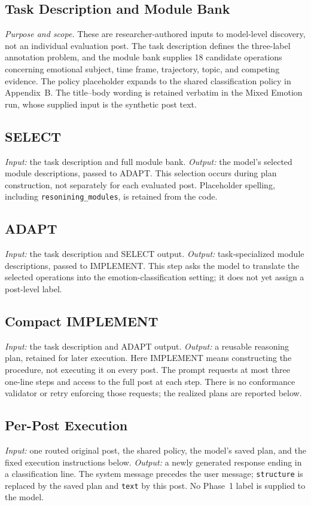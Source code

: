 \documentclass{ieeeaccess}
\begin{document}
\subsection{Task Description and Module Bank}
\textit{Purpose and scope.} These are researcher-authored inputs to model-level discovery, not an individual evaluation post. The task description defines the three-label annotation problem, and the module bank supplies 18 candidate operations concerning emotional subject, time frame, trajectory, topic, and competing evidence. The policy placeholder expands to the shared classification policy in Appendix~B. The title--body wording is retained verbatim in the Mixed Emotion run, whose supplied input is the synthetic post text.


\subsection{SELECT}
\textit{Input:} the task description and full module bank. \textit{Output:} the model's selected module descriptions, passed to ADAPT. This selection occurs during plan construction, not separately for each evaluated post. Placeholder spelling, including \texttt{resonining\_modules}, is retained from the code.

\subsection{ADAPT}
\textit{Input:} the task description and SELECT output. \textit{Output:} task-specialized module descriptions, passed to IMPLEMENT. This step asks the model to translate the selected operations into the emotion-classification setting; it does not yet assign a post-level label.

\subsection{Compact IMPLEMENT}
\textit{Input:} the task description and ADAPT output. \textit{Output:} a reusable reasoning plan, retained for later execution. Here IMPLEMENT means constructing the procedure, not executing it on every post. The prompt requests at most three one-line steps and access to the full post at each step. There is no conformance validator or retry enforcing those requests; the realized plans are reported below.

\subsection{Per-Post Execution}
\textit{Input:} one routed original post, the shared policy, the model's saved plan, and the fixed execution instructions below. \textit{Output:} a newly generated response ending in a classification line. The system message precedes the user message; \texttt{structure} is replaced by the saved plan and \texttt{text} by this post. No Phase~1 label is supplied to the model.
\end{document}
